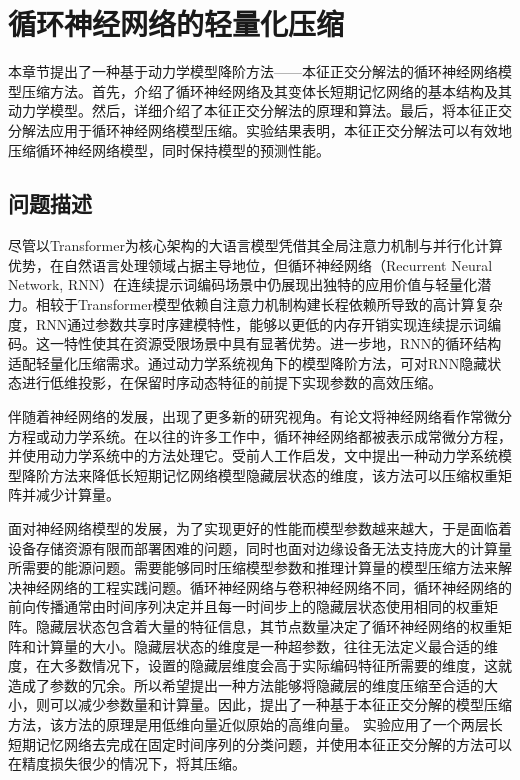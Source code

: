 \chapter{循环神经网络的轻量化压缩}
\label{cha:第三章}
本章节提出了一种基于动力学模型降阶方法——本征正交分解法的循环神经网络模型压缩方法。首先，介绍了循环神经网络及其变体长短期记忆网络的基本结构及其动力学模型。然后，详细介绍了本征正交分解法的原理和算法。最后，将本征正交分解法应用于循环神经网络模型压缩。实验结果表明，本征正交分解法可以有效地压缩循环神经网络模型，同时保持模型的预测性能。
\section{问题描述}
尽管以Transformer为核心架构的大语言模型凭借其全局注意力机制与并行化计算优势，在自然语言处理领域占据主导地位，但循环神经网络（Recurrent Neural Network, RNN）在连续提示词编码场景中仍展现出独特的应用价值与轻量化潜力\cite{liuGPTUnderstandsToo2023,liuPTuningV2Prompt2022}。相较于Transformer模型依赖自注意力机制构建长程依赖所导致的高计算复杂度，RNN通过参数共享时序建模特性，能够以更低的内存开销实现连续提示词编码。这一特性使其在资源受限场景中具有显著优势。进一步地，RNN的循环结构适配轻量化压缩需求。通过动力学系统视角下的模型降阶方法，可对RNN隐藏状态进行低维投影，在保留时序动态特征的前提下实现参数的高效压缩。

伴随着神经网络的发展，出现了更多新的研究视角。有论文将神经网络看作常微分方程或动力学系统\cite{chenNeuralOrdinaryDifferential2019}。在以往的许多工作中，循环神经网络都被表示成常微分方程\cite{rubanovaLatentODEsIrregularlySampled,mozerDiscreteEventContinuous2017}，并使用动力学系统中的方法处理它。受前人工作启发，文中提出一种动力学系统模型降阶方法来降低长短期记忆网络模型隐藏层状态的维度，该方法可以压缩权重矩阵并减少计算量。

面对神经网络模型的发展，为了实现更好的性能而模型参数越来越大，于是面临着设备存储资源有限而部署困难的问题\cite{dengModelCompressionHardware2020}，同时也面对边缘设备无法支持庞大的计算量所需要的能源问题\cite{hanDeepCompressionCompressing2016}。需要能够同时压缩模型参数和推理计算量的模型压缩方法来解决神经网络的工程实践问题。循环神经网络与卷积神经网络不同，循环神经网络的前向传播通常由时间序列决定并且每一时间步上的隐藏层状态使用相同的权重矩阵。隐藏层状态包含着大量的特征信息，其节点数量决定了循环神经网络的权重矩阵和计算量的大小。隐藏层状态的维度是一种超参数，往往无法定义最合适的维度，在大多数情况下，设置的隐藏层维度会高于实际编码特征所需要的维度，这就造成了参数的冗余。所以希望提出一种方法能够将隐藏层的维度压缩至合适的大小，则可以减少参数量和计算量。因此，提出了一种基于本征正交分解的模型压缩方法，该方法的原理是用低维向量近似原始的高维向量。
实验应用了一个两层长短期记忆网络去完成在固定时间序列的分类问题，并使用本征正交分解的方法可以在精度损失很少的情况下，将其压缩。

